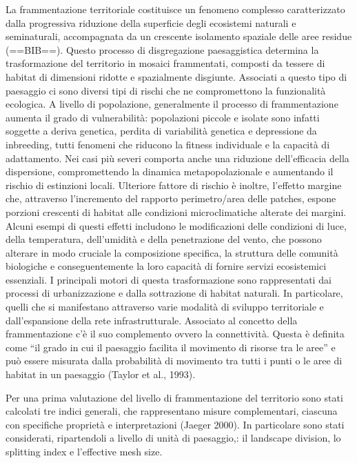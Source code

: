 \documentclass[
]{book}
\begin{document}
La frammentazione territoriale costituisce un fenomeno complesso caratterizzato dalla progressiva riduzione della superficie degli ecosistemi naturali e seminaturali, accompagnata da un crescente isolamento spaziale delle aree residue (==BIB==).
Questo processo di disgregazione paesaggistica determina la trasformazione del territorio in mosaici frammentati, composti da tessere di habitat di dimensioni ridotte e spazialmente disgiunte.
Associati a questo tipo di paesaggio ci sono diversi tipi di rischi che ne compromettono la funzionalità ecologica.
A livello di popolazione, generalmente il processo di frammentazione aumenta il grado di vulnerabilità: popolazioni piccole e isolate sono infatti soggette a deriva genetica, perdita di variabilità genetica e depressione da inbreeding, tutti fenomeni che riducono la fitness individuale e la capacità di adattamento.
Nei casi più severi comporta anche una riduzione dell'efficacia della dispersione, compromettendo la dinamica metapopolazionale e aumentando il rischio di estinzioni locali.
Ulteriore fattore di rischio è inoltre, l'effetto margine che, attraverso l'incremento del rapporto perimetro/area delle patches, espone porzioni crescenti di habitat alle condizioni microclimatiche alterate dei margini.
Alcuni esempi di questi effetti includono le modificazioni delle condizioni di luce, della temperatura, dell'umidità e della penetrazione del vento, che possono alterare in modo cruciale la composizione specifica, la struttura delle comunità biologiche e conseguentemente la loro capacità di fornire servizi ecosistemici essenziali.
I principali motori di questa trasformazione sono rappresentati dai processi di urbanizzazione e dalla sottrazione di habitat naturali.
In particolare, quelli che si manifestano attraverso varie modalità di sviluppo territoriale e dall'espansione della rete infrastrutturale.
Associato al concetto della frammentazione c'è il suo complemento ovvero la connettività.
Questa è definita come ``il grado in cui il paesaggio facilita il movimento di risorse tra le aree'' e può essere misurata dalla probabilità di movimento tra tutti i punti o le aree di habitat in un paesaggio (Taylor et al., 1993).

Per una prima valutazione del livello di frammentazione del territorio sono stati calcolati tre indici generali, che rappresentano misure complementari, ciascuna con specifiche proprietà e interpretazioni (Jaeger 2000).
In particolare sono stati considerati, ripartendoli a livello di unità di paesaggio,: il landscape division, lo splitting index e l'effective mesh size.
\end{document}
